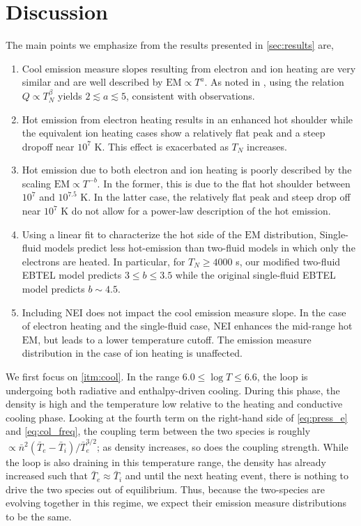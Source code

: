 \documentclass[apj]{emulateapj}
\begin{document}
	\section{Discussion}
	\label{sec:discussion}
	\par The main points we emphasize from the results presented in \autoref{sec:results} are,
	\begin{enumerate}
		\item Cool emission measure slopes resulting from electron and ion heating are very similar and are well described by $\mathrm{EM}\propto T^a$. As noted in \citet{cargill_active_2014}, using the relation $Q\propto T_N^{\beta}$ yields $2\lesssim a\lesssim5$, consistent with observations.\label{itm:cool}
		\item Hot emission from electron heating results in an enhanced hot shoulder while the equivalent ion heating cases show a relatively flat peak and a steep dropoff near $10^7$ K. This effect is exacerbated as $T_N$ increases.\label{itm:hot}
		\item Hot emission due to both electron and ion heating is poorly described by the scaling $\mathrm{EM}\propto T^{-b}$. In the former, this is due to the flat hot shoulder between $10^7$ and $10^{7.5}$ K. In the latter case, the relatively flat peak and steep drop off near $10^7$ K do not allow for a power-law description of the hot emission.\label{itm:deriv}
		\item Using a linear fit to characterize the hot side of the $\mathrm{EM}$ distribution, Single-fluid models predict less hot-emission than two-fluid models in which only the electrons are heated. In particular, for $T_N\ge4000$ s, our modified two-fluid EBTEL model predicts $3\le b\le3.5$ while the original single-fluid EBTEL model predicts $b\sim4.5$.\label{itm:histos}
		\item Including NEI does not impact the cool emission measure slope. In the case of electron heating and the single-fluid case, NEI enhances the mid-range hot $\mathrm{EM}$, but leads to a lower temperature cutoff. The emission measure distribution in the case of ion heating is unaffected. \label{itm:nei}
	\end{enumerate}
	\par We first focus on \autoref{itm:cool}. In the range $6.0\le\log{T}\le6.6$, the loop is undergoing both radiative and enthalpy-driven cooling. During this phase, the density is high and the temperature low relative to the heating and conductive cooling phase. Looking at the fourth term on the right-hand side of \autoref{eq:press_e} and \autoref{eq:col_freq}, the coupling term between the two species is roughly $\propto\bar{n}^2(\bar{T}_e-\bar{T}_i)/\bar{T}_e^{3/2}$; as density increases, so does the coupling strength. While the loop is also draining in this temperature range, the density has already increased such that $\bar{T}_e\approx\bar{T}_i$ and until the next heating event, there is nothing to drive the two species out of equilibrium. Thus, because the two-species are evolving together in this regime, we expect their emission measure distributions to be the same.
\end{document}

